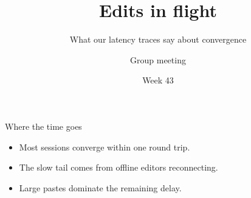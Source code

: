 \documentclass[aspectratio=169]{beamer}
\title{Edits in flight}
\subtitle{What our latency traces say about convergence}
\author{Group meeting}
\date{Week 43}
\begin{document}
\begin{frame}
  \titlepage
\end{frame}

\begin{frame}{Where the time goes}
  \begin{itemize}
    \item Most sessions converge within one round trip.
    \item The slow tail comes from offline editors reconnecting.
    \item Large pastes dominate the remaining delay.
  \end{itemize}
\end{frame}
\end{document}
